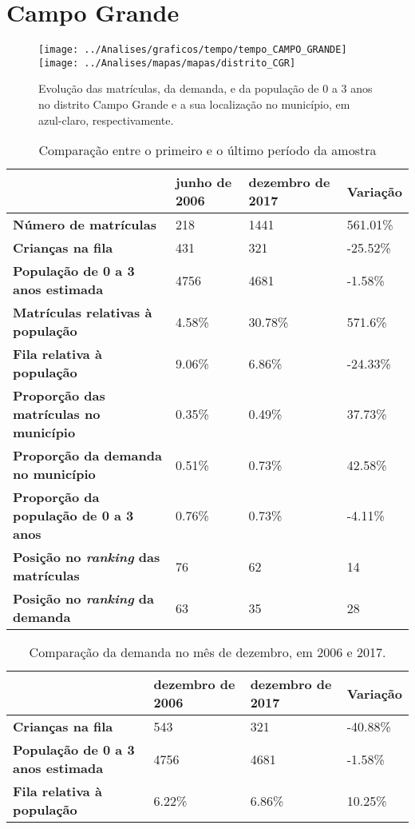 \section{Campo Grande}
\begin{figure}[H]
\centering
\texttt{[image: ../Analises/graficos/tempo/tempo\_CAMPO\_GRANDE]}
\texttt{[image: ../Analises/mapas/mapas/distrito\_CGR]}
\caption{Evolução das matrículas, da demanda, e da população de 0 a 3 anos no distrito Campo Grande e a sua localização no município, em azul-claro, respectivamente.}
\end{figure}
\begin{table}[H]
\begin{tabular}{l|l|l|l}
\textbf{}                                      & \textbf{junho de 2006}       & \textbf{dezembro de 2017}    & \textbf{Variação} \\ \hline
\textbf{Número de matrículas}                  & 218 & 1441 & 561.01\% \\ \hline
\textbf{Crianças na fila}                      & 431 & 321 & -25.52\% \\ \hline
\textbf{População de 0 a 3 anos estimada}      & 4756 & 4681 & -1.58\% \\ \hline
\textbf{Matrículas relativas à população}      & 4.58\% & 30.78\% & 571.6\% \\ \hline
\textbf{Fila relativa à população}             & 9.06\% & 6.86\% & -24.33\% \\ \hline
\textbf{Proporção das matrículas no município} & 0.35\% & 0.49\% & 37.73\% \\ \hline
\textbf{Proporção da demanda no município}     & 0.51\% & 0.73\% & 42.58\% \\ \hline
\textbf{Proporção da população de 0 a 3 anos}  & 0.76\% & 0.73\% & -4.11\% \\ \hline
\textbf{Posição no \textit{ranking} das matrículas}     & 76 & 62 & 14 \\ \hline
\textbf{Posição no \textit{ranking} da demanda}         & 63 & 35 & 28 \\ 
\end{tabular}
\caption{Comparação entre o primeiro e o último período da amostra}
\end{table}
\begin{table}[H]
\begin{tabular}{l|l|l|l}
\textbf{}                                 & \textbf{dezembro de 2006} & \textbf{dezembro de 2017} & \textbf{Variação} \\ \hline
\textbf{Crianças na fila}                      & 543 & 321 & -40.88\% \\ \hline
\textbf{População de 0 a 3 anos estimada}      & 4756 & 4681 & -1.58\% \\ \hline
\textbf{Fila relativa à população}             & 6.22\% & 6.86\% & 10.25\% \\
\end{tabular}
\caption{Comparação da demanda no mês de dezembro, em 2006 e 2017.}
\end{table}
